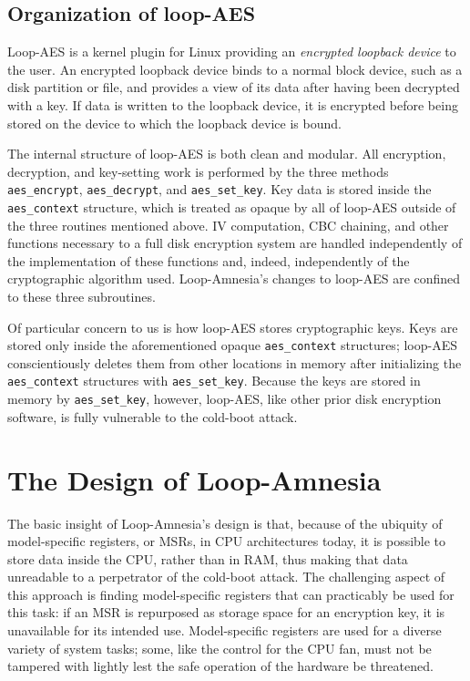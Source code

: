 \documentclass[letterpaper,twocolumn,nonatbib,10pt]{article}
\begin{document}
\subsection{Organization of loop-AES}

Loop-AES\cite{loopaes} is a kernel plugin for Linux providing an
\emph{encrypted loopback device} to the user.  An encrypted loopback
device binds to a normal block device, such as a disk partition or
file, and provides a view of its data after having been decrypted with
a key.  If data is written to the loopback device, it is
encrypted before being stored on the device to which the loopback
device is bound.

The internal structure of loop-AES is both clean and modular.  All
encryption, decryption, and key-setting work is performed by the three
methods \texttt{aes\_encrypt}, \texttt{aes\_decrypt}, and
\texttt{aes\_set\_key}.  Key data is stored inside the
\texttt{aes\_context} structure, which is treated as opaque by all of
loop-AES outside of the three routines mentioned above.  IV
computation, CBC chaining, and other functions necessary to a full
disk encryption system are handled independently of the implementation
of these functions and, indeed, independently of the cryptographic
algorithm used.  Loop-Amnesia's changes to loop-AES are confined to
these three subroutines.

Of particular concern to us is how loop-AES stores cryptographic keys.
Keys are stored only inside the aforementioned opaque
\texttt{aes\_context} structures; loop-AES conscientiously deletes
them from other locations in memory after initializing the
\texttt{aes\_context} structures with \texttt{aes\_set\_key}.  Because
the keys are stored in memory by \texttt{aes\_set\_key}, however,
loop-AES, like other prior disk encryption software, is fully
vulnerable to the cold-boot attack.

\section{The Design of Loop-Amnesia}

The basic insight of Loop-Amnesia's design is that, because of the
ubiquity of model-specific registers, or MSRs, in CPU architectures
today, it is possible to store data inside the CPU, rather than in
RAM, thus making that data unreadable to a perpetrator of the
cold-boot attack.  The challenging aspect of this approach is finding
model-specific registers that can practicably be used for this task:
if an MSR is repurposed as storage space for an encryption key, it is
unavailable for its intended use.  Model-specific registers are used
for a diverse variety of system tasks; some, like the control for the
CPU fan, must not be tampered with lightly lest the safe operation of
the hardware be threatened.
\end{document}

